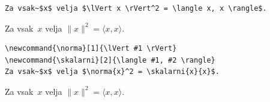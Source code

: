 \documentclass[aspectratio=169]{beamer}
\begin{document}
\begin{frame}[fragile]{}
  \begin{slaboenv}
    \begin{verbatim}
Za vsak~$x$ velja $\lVert x \rVert^2 = \langle x, x \rangle$.
    \end{verbatim}
Za vsak~$x$ velja $\lVert x \rVert^2 = \langle x, x \rangle$.
  \end{slaboenv}

  \begin{dobroenv}
    \begin{verbatim}
\newcommand{\norma}[1]{\lVert #1 \rVert}
\newcommand{\skalarni}[2]{\langle #1, #2 \rangle}
Za vsak~$x$ velja $\norma{x}^2 = \skalarni{x}{x}$.
    \end{verbatim}
\newcommand{\norma}[1]{\lVert #1 \rVert}
\newcommand{\skalarni}[2]{\langle #1, #2 \rangle}
Za vsak~$x$ velja $\norma{x}^2 = \skalarni{x}{x}$.
  \end{dobroenv}
\end{frame}
\end{document}
